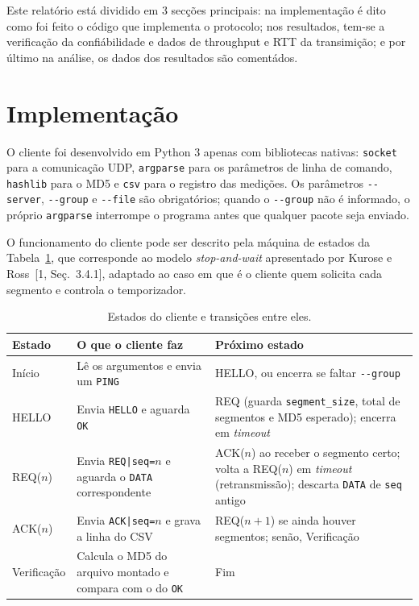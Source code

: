 \documentclass[11pt,a4paper]{article}
\begin{document}
Este relatório está dividido em 3 secções principais: na implementação é dito como foi feito o código que implementa o protocolo;
nos resultados, tem-se a verificação da confiábilidade e dados de throughput e RTT da transimição; e por último na análise, os dados
dos resultados são comentádos.

\section{Implementação}

O cliente foi desenvolvido em Python 3 apenas com bibliotecas nativas: \texttt{socket}
para a comunicação UDP, \texttt{argparse} para os parâmetros de linha de comando,
\texttt{hashlib} para o MD5 e \texttt{csv} para o registro das medições. Os parâmetros
\texttt{-{}-server}, \texttt{-{}-group} e \texttt{-{}-file} são obrigatórios; quando o
\texttt{-{}-group} não é informado, o próprio \texttt{argparse} interrompe o programa
antes que qualquer pacote seja enviado.

O funcionamento do cliente pode ser descrito pela máquina de estados da
Tabela~\ref{tab:estados}, que corresponde ao modelo \textit{stop-and-wait} apresentado
por Kurose e Ross~[1, Seç.~3.4.1], adaptado ao caso em que é o cliente quem solicita
cada segmento e controla o temporizador.

\begin{table}[H]
\centering
\caption{Estados do cliente e transições entre eles.}
\label{tab:estados}
\small
\begin{tabular}{@{}p{2.6cm}p{5.4cm}p{6.2cm}@{}}
\toprule
\textbf{Estado} & \textbf{O que o cliente faz} & \textbf{Próximo estado} \\
\midrule
Início & Lê os argumentos e envia um \texttt{PING} & HELLO, ou encerra se faltar \texttt{-{}-group} \\
HELLO & Envia \texttt{HELLO} e aguarda \texttt{OK} & REQ (guarda \texttt{segment\_size},
total de segmentos e MD5 esperado); encerra em \textit{timeout} \\
REQ($n$) & Envia \texttt{REQ|seq=$n$} e aguarda o \texttt{DATA} correspondente &
ACK($n$) ao receber o segmento certo; volta a REQ($n$) em \textit{timeout}
(retransmissão); descarta \texttt{DATA} de \texttt{seq} antigo \\
ACK($n$) & Envia \texttt{ACK|seq=$n$} e grava a linha do CSV & REQ($n+1$) se ainda
houver segmentos; senão, Verificação \\
Verificação & Calcula o MD5 do arquivo montado e compara com o do \texttt{OK} &
Fim \\
\bottomrule
\end{tabular}
\end{table}
\end{document}
